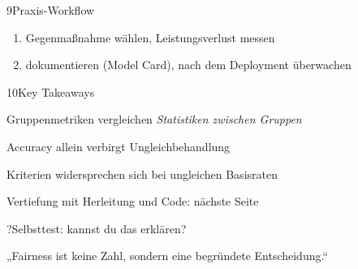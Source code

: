 \begin{hngrid}
\begin{hnp}[raster multicolumn=3,acc=hngreen]{9}{Praxis-Workflow}
\begin{enumerate}
\item Gegenmaßnahme wählen, Leistungsverlust messen
\item dokumentieren (Model Card), nach dem Deployment überwachen
\end{enumerate}
\end{hnp}
%
\begin{hnp}[raster multicolumn=3,acc=hnorange]{10}{Key Takeaways}
\begin{hnchk}
\item Gruppenmetriken vergleichen \emph{Statistiken zwischen Gruppen}
\item Accuracy allein verbirgt Ungleichbehandlung
\item Kriterien widersprechen sich bei ungleichen Basisraten
\item Vertiefung mit Herleitung und Code: nächste Seite
\end{hnchk}
\end{hnp}
%
\begin{hnp}[raster multicolumn=6,acc=hnpurple,colback=hnlilac!30]{?}{Selbsttest: kannst du das erklären?}
\end{hnp}
%
\begin{hnbanner}[raster multicolumn=6]
„Fairness ist keine Zahl, sondern eine begründete Entscheidung.“
\end{hnbanner}
\end{hngrid}
